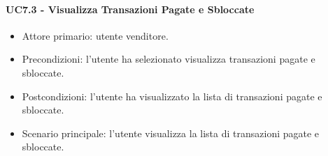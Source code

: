 \paragraph{UC7.3 - Visualizza Transazioni Pagate e Sbloccate}

\begin{itemize}
    \item Attore primario: utente venditore.
    \item Precondizioni: l'utente ha selezionato visualizza transazioni pagate e sbloccate.
    \item Postcondizioni: l'utente ha visualizzato la lista di transazioni pagate e sbloccate.
    \item Scenario principale: l'utente visualizza la lista di transazioni pagate e sbloccate.
\end{itemize}

